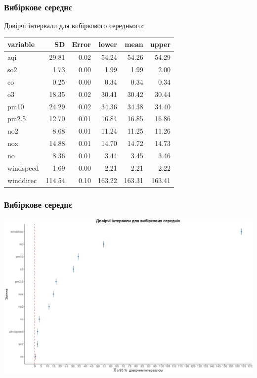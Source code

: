 \documentclass{beamer}
\begin{document}
\begin{frame}
  \frametitle{Вибiркове середнє}

  Довірчі інтервали для вибіркового середнього:

  \begin{table}[ht]
    \centering
    \begin{tabular}{lrrrrr}
      \hline
      variable  & SD & Error & lower & mean & upper \\ 
      \hline
      aqi       & 29.81  & 0.02 & 54.24  & 54.26  & 54.29 \\ 
      so2       & 1.73   & 0.00 & 1.99   & 1.99   & 2.00 \\ 
      co        & 0.25   & 0.00 & 0.34   & 0.34   & 0.34 \\ 
      o3        & 18.35  & 0.02 & 30.41  & 30.42  & 30.44 \\ 
      pm10      & 24.29  & 0.02 & 34.36  & 34.38  & 34.40 \\ 
      pm2.5     & 12.70  & 0.01 & 16.84  & 16.85  & 16.86 \\ 
      no2       & 8.68   & 0.01 & 11.24  & 11.25  & 11.26 \\ 
      nox       & 14.88  & 0.01 & 14.70  & 14.72  & 14.73 \\ 
      no        & 8.36   & 0.01 & 3.44   & 3.45   & 3.46 \\ 
      windspeed & 1.69   & 0.00 & 2.21   & 2.21   & 2.22 \\ 
      winddirec & 114.54 & 0.10 & 163.22 & 163.31 & 163.41 \\ 
       \hline
    \end{tabular}
  \end{table}
  
\end{frame}

\begin{frame}
  \frametitle{Вибiркове середнє}

  \begin{center}
    \includegraphics[width=\linewidth]{./plots/lab2/1-4-part/ci-means.png}
  \end{center}
  
\end{frame}
\end{document}
